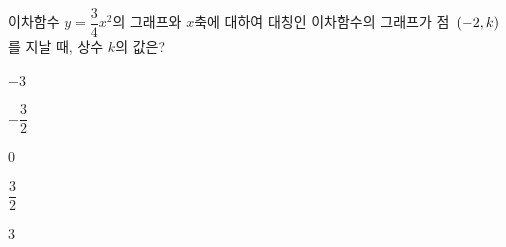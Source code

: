 이차함수 $y=\dfrac{3}{4}x^2$의 그래프와 $x$축에 대하여 대칭인 이차함수의 그래프가 점~$(-2{,}\mkern3mu k)$를 지날 때, 상수 $k$의 값은?
\begin{choices32}{\rule[-3ex]{0pt}{8ex}$-3$}{\rule[-3ex]{0pt}{8ex}$-\dfrac{3}{2}$}{\rule[-3ex]{0pt}{8ex}$0$}{\rule[-3ex]{0pt}{8ex}$\dfrac{3}{2}$}{\rule[-3ex]{0pt}{8ex}$3$}\end{choices32}
